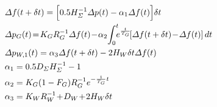 \documentclass[lettersize,journal]{IEEEtran}
\begin{document}
\vspace{-0.125in}
\begin{newsubequations}\label{eqn:3}
	\begin{align}
		 & \varDelta f(t+\delta t) = \Bigl [ 0.5{H_{\varSigma}^{-1}}\varDelta p(t)  - \alpha_1\varDelta f(t) \Bigr ] \delta t   \label{eqn:3a}                                                                  \\
		 & \varDelta p_{G}(t)\!=\!{K_{G} }{ R_{G}^{-1}} \varDelta f(t) \!-\! \alpha_2 \!\int_{0}^{t} \!\!\! e^{\frac{t}{T_G}} \!\!\left[\varDelta f(t+\delta t) \!-\! \varDelta f(t) \right] dt  \label{eqn:3b} \\
		 & \varDelta p_{W,1}(t) = \alpha_3 \varDelta f(t + \delta t) - 2H_{W} \delta t \varDelta f(t)  \label{eqn:3c}                                                                                           \\
		 & \alpha_1 = 0.5{D_{\varSigma}}{H_{\varSigma}^{-1}}-1 \label{eqn:3d}                                                                                                                                   \\
		 & \alpha_2 = {K_G(1-F_G)}{ R_{G}^{-1} }e^{-\frac{1}{T_G} t} \label{eqn:3e}                                                                                                                             \\
		 & \alpha_3 = {K_{W} } R_{W}^{-1} \!+\! D_{W} \!+\! 2H_{W} \delta t \label{eqn:3f}
	\end{align} \end{newsubequations}
\end{document}
